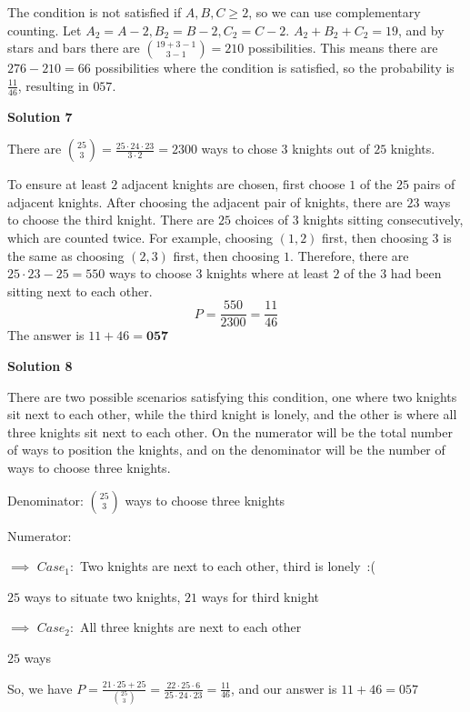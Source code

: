 \begin{enumerate}
 The condition is not satisfied if $A, B, C \geq 2$, so we can use complementary counting. Let $A_2 = A - 2, B_2 = B - 2, C_2 = C - 2$. $A_2 + B_2 + C_2 = 19$, and by stars and bars there are $\binom{19 + 3 - 1}{3 - 1} = 210$ possibilities. This means there are $276 - 210 = 66$ possibilities where the condition is satisfied, so the probability is $\frac{11}{46}$, resulting in $\boxed{057}$.

 



\textbf{Solution 7}

There are $\binom{25}{3}=\frac{25 \cdot 24 \cdot 23}{3 \cdot 2}=2300$ ways to chose $3$ knights out of $25$ knights.

 To ensure at least $2$ adjacent knights are chosen, first choose $1$ of the $25$ pairs of adjacent knights. After choosing the adjacent pair of knights, there are $23$ ways to choose the third knight. There are $25$ choices of $3$ knights sitting consecutively, which are counted twice. For example, choosing $(1,2)$ first, then choosing $3$ is the same as choosing $(2,3)$ first, then choosing $1$. Therefore, there are $25 \cdot 23 -25=550$ ways to choose $3$ knights where at least $2$ of the $3$ had been sitting next to each other.
 \[P=\frac{550}{2300}=\frac{11}{46}\]The answer is $11+46=\boxed{\textbf{057}}$




\textbf{Solution 8}

There are two possible scenarios satisfying this condition, one where two knights sit next to each other, while the third knight is lonely, and the other is where all three knights sit next to each other. On the numerator will be the total number of ways to position the knights, and on the denominator will be the number of ways to choose three knights.

 Denominator: $\binom{25}{3}$ ways to choose three knights

 Numerator:

 $\implies$ $Case_1:$ Two knights are next to each other, third is lonely :(

 $25$ ways to situate two knights, $21$ ways for third knight

 
$\implies$ $Case_2:$ All three knights are next to each other

 $25$ ways

 So, we have $P = \frac{21 \cdot 25+25}{\binom{25}{3}}$$= \frac{22 \cdot 25 \cdot 6}{25 \cdot 24 \cdot 23}$$= \frac{11}{46}$, and our answer is $11+46=\boxed{057}$





\end{enumerate}
